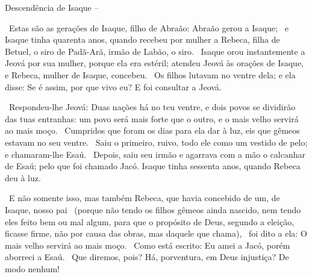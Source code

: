 \documentclass[12pt,aspectratio=169]{beamer}
\newcommand{\ver}[1]{%
    \raisebox{0.50ex}{%
        \scalebox{1.1}{%
            \pmb{\textbf{\textcolor{BSpbg}{#1}}}%
        }%
    }%
}
\newcommand{\QUOTE}[1]{%
    \par\noindent\hspace*{0.05\linewidth}%
    \begin{minipage}{0.9\linewidth}%
        \linespread{1.35}\large{#1}%
    \end{minipage}%
}
\newcommand{\ORA}[1]{{\textcolor{TXred!50!TXyel}{#1}}}
\newcommand{\YEL}[1]{{\textcolor{TXyel}{#1}}}
\newcommand{\GRE}[1]{{\textcolor{TXgre}{#1}}}
\begin{document}
    \begin{frame}[allowframebreaks]{Descendência de \YEL{Isaque} --}
        \QUOTE{%
            \ver{Gn 25.19}~Estas são as gerações de Isaque, filho de Abraão: \YEL{Abraão} gerou
            a \YEL{Isaque};
            \ver{20}~e Isaque tinha quarenta anos, quando recebeu por mulher a Rebeca, filha de
            Betuel, o siro de Padã-Arã, irmão de Labão, o siro.
            \ver{21}~Isaque orou instantemente a Jeová por sua mulher, porque ela era estéril;
            atendeu Jeová às orações de Isaque, e Rebeca, mulher de Isaque, concebeu.
            \ver{22}~Os filhos lutavam no ventre dela; e ela disse: Se é assim, por que vivo eu?
            E foi consultar a Jeová.
        }

        \pagebreak

        \QUOTE{%
            \ver{23}~Respondeu-lhe Jeová: \ORA{Duas nações} há no teu ventre, e dois povos se
            \ORA{dividirão} das tuas entranhas: \ORA{um povo será mais forte que o outro}, e
            \ORA{o mais velho servirá ao mais moço}.
            \ver{24}~Cumpridos que foram os dias para ela dar à luz, eis que gêmeos estavam no
            seu ventre.
            \ver{25}~Saiu o primeiro, ruivo, todo ele como um vestido de pelo; e chamaram-lhe
            \ORA{Esaú}.
            \ver{26}~Depois, saiu seu irmão e agarrava com a mão o calcanhar de Esaú; pelo que
            foi chamado \YEL{Jacó}. Isaque tinha sessenta anos, quando Rebeca deu à luz.
        }

        \pagebreak

        \QUOTE{%
            \ver{Rm 9.10}~E não somente isso, mas também Rebeca, que havia concebido de um, de
            Isaque, nosso pai
            \ver{11}~(porque não tendo os filhos gêmeos \YEL{ainda nascido}, nem tendo eles
            \YEL{feito bem ou mal} algum, para que o propósito de Deus, segundo a \ORA{eleição},
            ficasse firme, não por causa das obras, mas daquele que chama),
            \ver{12}~foi dito a ela: \ORA{O mais velho servirá ao mais moço}.
            \ver{13}~Como está escrito: \ORA{Eu amei a Jacó, porém aborreci a Esaú}.
            \ver{14}~Que diremos, pois? \GRE{Há, porventura, em Deus injustiça? De modo nenhum!}
        }


\end{frame}
\end{document}
